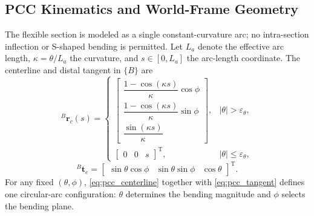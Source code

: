 \documentclass[journal,twoside]{IEEEtran}
\begin{document}
\subsection{PCC Kinematics and World-Frame Geometry}
The flexible section is modeled as a single constant-curvature arc; no intra-section inflection or S-shaped bending is permitted. Let $L_a$ denote the effective arc length, $\kappa=\theta/L_a$ the curvature, and $s\in[0,L_a]$ the arc-length coordinate. The centerline and distal tangent in $\{B\}$ are
\begin{equation}
{}^{B}\mathbf r_c(s)=
\begin{cases}
\begin{bmatrix}
\dfrac{1-\cos(\kappa s)}{\kappa}\cos\phi\\[1mm]
\dfrac{1-\cos(\kappa s)}{\kappa}\sin\phi\\[1mm]
\dfrac{\sin(\kappa s)}{\kappa}
\end{bmatrix}, & |\theta|>\varepsilon_\theta,\\[5mm]
\begin{bmatrix}0&0&s\end{bmatrix}^{\!\mathrm T}, & |\theta|\le\varepsilon_\theta,
\end{cases}
\label{eq:pcc_centerline}
\end{equation}
\begin{equation}
{}^{B}\mathbf t_e=
\begin{bmatrix}
\sin\theta\cos\phi&
\sin\theta\sin\phi&
\cos\theta
\end{bmatrix}^{\!\mathrm T}.
\label{eq:pcc_tangent}
\end{equation}
For any fixed $(\theta,\phi)$, \eqref{eq:pcc_centerline} together with \eqref{eq:pcc_tangent} defines one circular-arc configuration: $\theta$ determines the bending magnitude and $\phi$ selects the bending plane.
\end{document}
